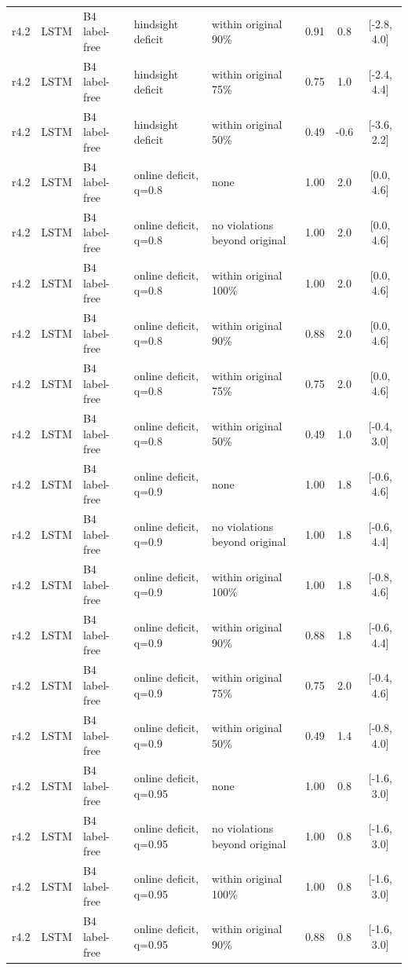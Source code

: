 \begin{longtable}{lllp{4.2cm}p{3.4cm}ccc}
r4.2 & LSTM & B4 label-free & hindsight deficit & within original 90\% & 0.91 & 0.8 & [-2.8, 4.0] \\
r4.2 & LSTM & B4 label-free & hindsight deficit & within original 75\% & 0.75 & 1.0 & [-2.4, 4.4] \\
r4.2 & LSTM & B4 label-free & hindsight deficit & within original 50\% & 0.49 & -0.6 & [-3.6, 2.2] \\
r4.2 & LSTM & B4 label-free & online deficit, q=0.8 & none & 1.00 & 2.0 & [0.0, 4.6] \\
r4.2 & LSTM & B4 label-free & online deficit, q=0.8 & no violations beyond original & 1.00 & 2.0 & [0.0, 4.6] \\
r4.2 & LSTM & B4 label-free & online deficit, q=0.8 & within original 100\% & 1.00 & 2.0 & [0.0, 4.6] \\
r4.2 & LSTM & B4 label-free & online deficit, q=0.8 & within original 90\% & 0.88 & 2.0 & [0.0, 4.6] \\
r4.2 & LSTM & B4 label-free & online deficit, q=0.8 & within original 75\% & 0.75 & 2.0 & [0.0, 4.6] \\
r4.2 & LSTM & B4 label-free & online deficit, q=0.8 & within original 50\% & 0.49 & 1.0 & [-0.4, 3.0] \\
r4.2 & LSTM & B4 label-free & online deficit, q=0.9 & none & 1.00 & 1.8 & [-0.6, 4.6] \\
r4.2 & LSTM & B4 label-free & online deficit, q=0.9 & no violations beyond original & 1.00 & 1.8 & [-0.6, 4.4] \\
r4.2 & LSTM & B4 label-free & online deficit, q=0.9 & within original 100\% & 1.00 & 1.8 & [-0.8, 4.6] \\
r4.2 & LSTM & B4 label-free & online deficit, q=0.9 & within original 90\% & 0.88 & 1.8 & [-0.6, 4.4] \\
r4.2 & LSTM & B4 label-free & online deficit, q=0.9 & within original 75\% & 0.75 & 2.0 & [-0.4, 4.6] \\
r4.2 & LSTM & B4 label-free & online deficit, q=0.9 & within original 50\% & 0.49 & 1.4 & [-0.8, 4.0] \\
r4.2 & LSTM & B4 label-free & online deficit, q=0.95 & none & 1.00 & 0.8 & [-1.6, 3.0] \\
r4.2 & LSTM & B4 label-free & online deficit, q=0.95 & no violations beyond original & 1.00 & 0.8 & [-1.6, 3.0] \\
r4.2 & LSTM & B4 label-free & online deficit, q=0.95 & within original 100\% & 1.00 & 0.8 & [-1.6, 3.0] \\
r4.2 & LSTM & B4 label-free & online deficit, q=0.95 & within original 90\% & 0.88 & 0.8 & [-1.6, 3.0] \\

\end{longtable}
